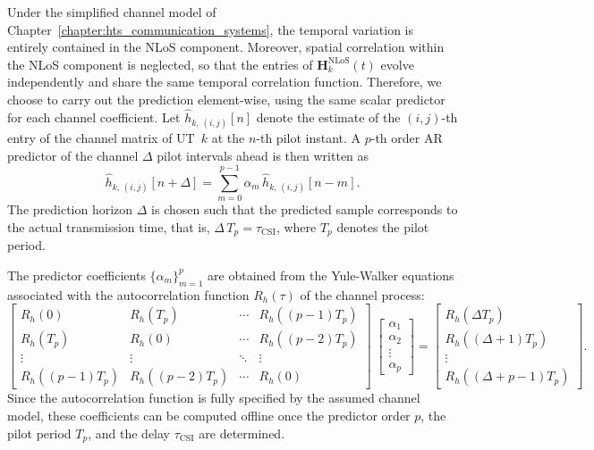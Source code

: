 Under the simplified channel model of Chapter~\ref{chapter:hts_communication_systems}, the temporal variation is entirely contained in the \ac{NLoS} component. Moreover, spatial correlation within the \ac{NLoS} component is neglected, so that the entries of $\mathbf{H}_k^{\mathrm{NLoS}}(t)$ evolve independently and share the same temporal correlation function. Therefore, we choose to carry out the prediction element-wise, using the same scalar predictor for each channel coefficient. 
Let $\hat{h}_{k, \,(i, j)}[n]$ denote the estimate of the $(i,j)$-th entry of the channel matrix of \ac{UT}~$k$ at the $n$-th pilot instant. A $p$-th order \ac{AR} predictor of the channel $\Delta$ pilot intervals ahead is then written as
\begin{equation}
\label{eq:ar_predictor}
    \hat{h}_{k, \,(i, j)}[n+\Delta] = \sum_{m=0}^{p-1} \alpha_m \, \hat{h}_{k, \,(i, j)}[n-m].
\end{equation}
The prediction horizon $\Delta$ is chosen such that the predicted sample corresponds to the actual transmission time, that is, $\Delta \, T_p = \tau_{\mathrm{CSI}}$, where $T_p$ denotes the pilot period.

The predictor coefficients $\{\alpha_m\}_{m=1}^{p}$ are obtained from the Yule-Walker equations associated with the autocorrelation function $R_h(\tau)$ of the channel process:
\begin{equation}
\label{eq:yule_walker_equations}
    \begin{bmatrix} R_h(0) & R_h(T_p) & \cdots & R_h((p-1)T_p) \\ R_h(T_p) & R_h(0) & \cdots & R_h((p-2)T_p) \\ \vdots & \vdots & \ddots & \vdots \\ R_h((p-1)T_p) & R_h((p-2)T_p) & \cdots & R_h(0) \end{bmatrix} \; \begin{bmatrix} \alpha_1 \\ \alpha_2 \\ \vdots \\ \alpha_p \end{bmatrix} = \begin{bmatrix} R_h(\Delta T_p) \\ R_h((\Delta+1)T_p) \\ \vdots \\ R_h((\Delta+p-1)T_p) \end{bmatrix}.
\end{equation}
Since the autocorrelation function is fully specified by the assumed channel model, these coefficients can be computed offline once the predictor order $p$, the pilot period $T_p$, and the delay $\tau_{\mathrm{CSI}}$ are determined.

